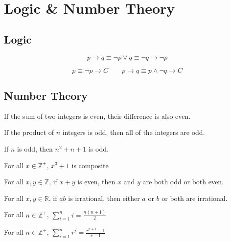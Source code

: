 \section{Logic \& Number Theory}
\subsection*{Logic}
\begin{theorem}
	$$
		p\rightarrow q \equiv \neg p \lor q \equiv \neg q \rightarrow \neg p
	$$
\end{theorem}
\begin{theorem}
	$$
	p\equiv \neg p \rightarrow C \qquad p\rightarrow q \equiv p \land \neg q \rightarrow C
	$$
\end{theorem}

\subsection*{Number Theory}
\begin{theorem}
	If the sum of two integers is even, their difference is also even.
\end{theorem}

\begin{theorem}
If the product of $n$ integers is odd, then all of the integers are odd.
\end{theorem}

\begin{theorem}
	If $n$ is odd, then $n^2+n+1$ is odd.
\end{theorem}

\begin{theorem}
	For all $x\in \mathbb{Z}^+$, $x^3+1$ is composite
\end{theorem}

\begin{theorem}
	For all $x,y\in \mathbb{Z}$, if $x+y$ is even, then $x$ and $y$ are both odd or both even.
\end{theorem}

\begin{theorem}
	For all $x,y\in \mathbb{R}$, if $ab$ is irrational, then either $a$ or $b$ or both are irrational.
\end{theorem}

\begin{theorem}
	For all $n\in \mathbb{Z}^+$, $\sum_{i=1}^n i = \frac{n(n+1)}{2}$
\end{theorem}

\begin{theorem}
	For all $n\in \mathbb{Z}^+$, $\sum_{i=1}^n r^i = \frac{r^{n+1}-1}{r-1}$
\end{theorem}

